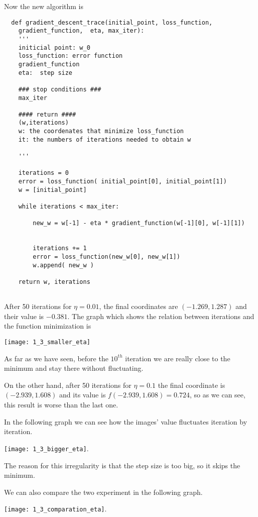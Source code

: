 Now the new algorithm is
\begin{verbatim}
  def gradient_descent_trace(initial_point, loss_function,
    gradient_function,  eta, max_iter):
    '''
    initicial point: w_0 
    loss_function: error function 
    gradient_function
    eta:  step size 

    ### stop conditions ###
    max_iter

    #### return ####
    (w,iterations)
    w: the coordenates that minimize loss_function
    it: the numbers of iterations needed to obtain w
    
    '''

    iterations = 0
    error = loss_function( initial_point[0], initial_point[1])
    w = [initial_point]
  
    while iterations < max_iter: 

        new_w = w[-1] - eta * gradient_function(w[-1][0], w[-1][1])
        
        
        iterations += 1
        error = loss_function(new_w[0], new_w[1])
        w.append( new_w ) 
    
    return w, iterations
  
  \end{verbatim}


  After 50 iterations for  $\eta = 0.01$, the  final coordinates are $(-1.269, 1.287)$ and their value is $-0.381$. The graph which shows the relation between iterations and the function minimization is


  \texttt{[image: 1\_3\_smaller\_eta]}

  As far as we have seen, before the $10^{th}$ iteration we are really close to the minimum and stay there without fluctuating.

  On the other hand, after 50 iterations for  $\eta = 0.1$ the final coordinate is $(-2.939, 1.608)$ and its value is $f(-2.939, 1.608) = 0.724$, so as we can see, this result is worse than the last one.

  In the following graph we can see how the images' value fluctuates iteration by iteration. 

  \texttt{[image: 1\_3\_bigger\_eta]}.

 The reason for this irregularity  is that the step size is too big, so it skips the minimum.

 We can also  compare the two experiment in the following graph.
 
\texttt{[image: 1\_3\_comparation\_eta]}.


